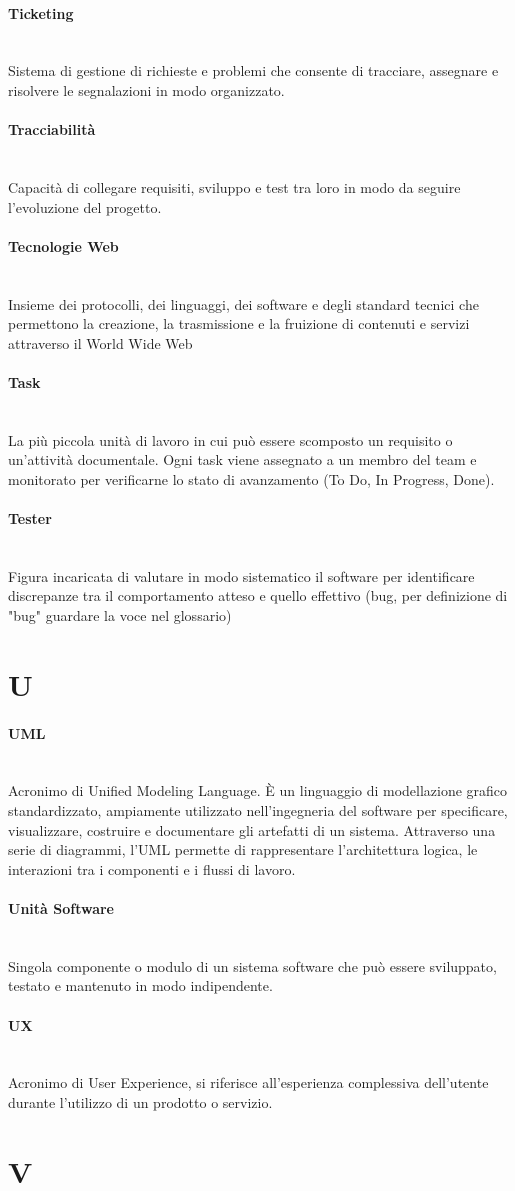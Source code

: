 \documentclass[a4paper, 10pt, colorlinks=true, linkcolor=black, urlcolor=blue, citecolor=blue, hidelinks]{article}
\newcommand{\glossaryterm}[2]{
    \paragraph{#1 \label{term:#1}} \mbox{} \\
    #2
    \vspace{0.5em}
}
\begin{document}
\glossaryterm{Ticketing}{Sistema di gestione di richieste e problemi che consente di tracciare, assegnare e risolvere le segnalazioni in modo organizzato.}

\glossaryterm{Tracciabilità}{Capacità di collegare requisiti, sviluppo e test tra loro in modo da seguire l'evoluzione del progetto.}

\glossaryterm{Tecnologie Web}{Insieme dei protocolli, dei linguaggi, dei software e degli standard tecnici che permettono la creazione, la trasmissione e la fruizione di contenuti e servizi attraverso il World Wide Web}

\glossaryterm{Task}{La più piccola unità di lavoro in cui può essere scomposto un requisito o un'attività documentale. Ogni task viene assegnato a un membro del team e monitorato per verificarne lo stato di avanzamento (To Do, In Progress, Done).}

\glossaryterm{Tester}{Figura incaricata di valutare in modo sistematico il software per identificare discrepanze tra il comportamento atteso e quello effettivo (bug, per definizione di "bug" guardare la voce nel glossario)}

\newpage

\section*{U}

\glossaryterm{UML}{Acronimo di Unified Modeling Language. È un linguaggio di modellazione grafico standardizzato, ampiamente utilizzato nell'ingegneria del software per specificare, visualizzare, costruire e documentare gli artefatti di un sistema. Attraverso una serie di diagrammi, l'UML permette di rappresentare l'architettura logica, le interazioni tra i componenti e i flussi di lavoro.}

\glossaryterm{Unità Software}{Singola componente o modulo di un sistema software che può essere sviluppato, testato e mantenuto in modo indipendente.}

\glossaryterm{UX}{Acronimo di User Experience, si riferisce all'esperienza complessiva dell'utente durante l'utilizzo di un prodotto o servizio.}

\newpage

\section*{V}
\end{document}
